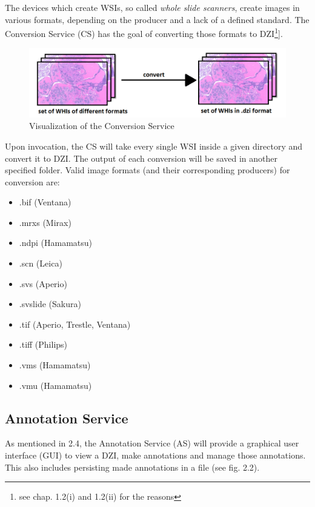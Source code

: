 The devices which create WSIs, so called \emph{whole slide scanners}, create images in various formats, depending on the producer and a lack of a defined standard\cite{Cornish13}. The Conversion Service (CS) has the goal of converting those formats to DZI\footnote{see chap. 1.2(i) and 1.2(ii) for the reasons}].

\begin{figure}[H]
	\begin{center}
		\includegraphics[scale=0.35]{img/processChainA.png}
		\caption{Visualization of the Conversion Service}
		\label{fig:fig2.1}
	\end{center}
\end{figure}

Upon invocation, the CS will take every single WSI inside a given directory and convert it to DZI. The output of each conversion will be saved in another specified folder. Valid image formats (and their corresponding producers) for conversion are:

\begin{itemize}
	\item .bif (Ventana)
	\item .mrxs (Mirax)
	\item .ndpi (Hamamatsu)
	\item .scn (Leica)
	\item .svs (Aperio)
	\item .svslide (Sakura)
	\item .tif (Aperio, Trestle, Ventana)
	\item .tiff (Philips)
	\item .vms (Hamamatsu)
	\item .vmu (Hamamatsu)
\end{itemize}


\subsection{Annotation Service}
As mentioned in 2.4, the Annotation Service (AS) will provide a graphical user interface (GUI) to view a DZI, make annotations and manage those annotations. This also includes persisting made annotations in a file (see fig. 2.2).

